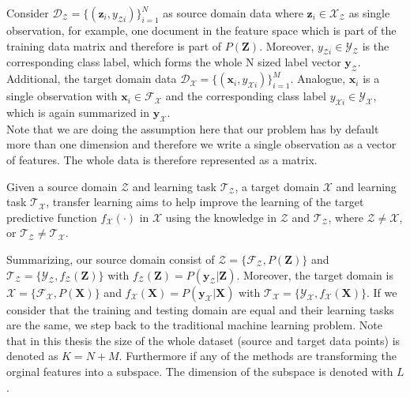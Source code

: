 Consider $\mathcal{D_Z} = \{(\mathbf{z}_i,y_{\mathcal{Z}i})\}_{i=1}^{N}$ as source domain data where $\mathbf{z}_i \in \mathcal{X}_\mathcal{Z}$ as single observation, for example, one document in the feature space which is part of the training data matrix and therefore is part of $P(\mathbf{Z})$.
Moreover, $y_{\mathcal{Z}i} \in \mathcal{Y}_\mathcal{Z}$ is the corresponding class label, which forms the whole N sized label vector $\mathbf{y}_\mathcal{Z}$.
Additional, the target domain data $\mathcal{D_X} = \{(\mathbf{x}_i,y_{\mathcal{X}i})\}_{i=1}^{M}$.
Analogue, $\mathbf{x}_i$ is a single observation with $\mathbf{x}_i \in \mathcal{F}_\mathcal{X}$ and the corresponding class label $y_{\mathcal{X}i} \in \mathcal{Y}_\mathcal{X}$, which is again summarized in $\mathbf{y}_\mathcal{X}$.\cite[p. 2]{Aggarwal.2015}\\
Note that we are doing the assumption here that our problem has by default more than one dimension and therefore we write a single observation as a vector of features.
The whole data is therefore represented as a matrix.
\begin{mDef}\label{DefTl}
	Given a source domain $\mathcal{Z}$ and learning task $\mathcal{T}_\mathcal{Z}$, a target domain $\mathcal{X}$ and learning task $\mathcal{T}_\mathcal{X}$, transfer learning aims to help improve the learning of the target predictive function $f_\mathcal{X}(\cdot)$ in $\mathcal{X}$ using the knowledge in $\mathcal{Z}$ and $\mathcal{T}_\mathcal{Z}$, where $\mathcal{Z} \neq \mathcal{X}$, or $\mathcal{T}_\mathcal{Z} \neq \mathcal{T}_\mathcal{X}$.\cite[p. 542]{Aggarwal.2015}
\end{mDef}
Summarizing, our source domain consist of $\mathcal{Z}=\{\mathcal{F}_\mathcal{Z},P(\mathbf{Z})\}$ and $\mathcal{T_Z}=\{\mathcal{Y_Z},f_\mathcal{Z}(\mathbf{Z})\}$ with $f_\mathcal{Z}(\mathbf{Z}) = P(\mathbf{y}_\mathcal{Z}|\mathbf{Z})$. Moreover, the target domain is  $\mathcal{X}=\{\mathcal{F}_\mathcal{X},P(\mathbf{X})\}$ and $f_\mathcal{X}(\mathbf{X}) = P(\mathbf{y}_\mathcal{X}|\mathbf{X})$ with $\mathcal{T_X}=\{\mathcal{Y_X},f_\mathcal{X}(\mathbf{X})\}$. 
If we consider that the training and testing domain are equal and their learning tasks are the same, we step back to the traditional machine learning problem.
Note that in this thesis the size of the whole dataset (source and target data points) is denoted as $K=N+M$.
Furthermore if any of the methods are transforming the orginal features into a subspace. The dimension of the subspace is denoted with $L$.\\
